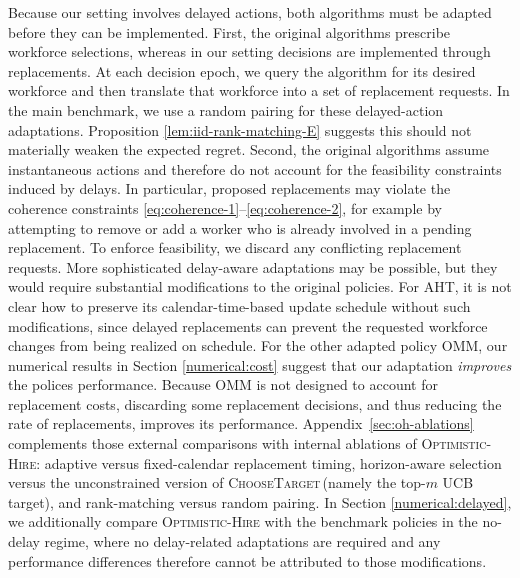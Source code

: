 \documentclass[opre,blindrev]{informs3}
\newcommand{\ChooseTarget}{\textsc{ChooseTarget}\,}
\begin{document}
Because our setting involves delayed actions, both algorithms must be adapted before they can be implemented. First, the original algorithms prescribe workforce selections, whereas in our setting decisions are implemented through replacements. At each decision epoch, we query the algorithm for its desired workforce and then translate that workforce into a set of replacement requests. In the main benchmark, we use a random pairing for these delayed-action adaptations. Proposition \ref{lem:iid-rank-matching-E} suggests this should not materially weaken the expected regret. Second, the original algorithms assume instantaneous actions and therefore do not account for the feasibility constraints induced by delays. In particular, proposed replacements may violate the coherence constraints \eqref{eq:coherence-1}--\eqref{eq:coherence-2}, for example by attempting to remove or add a worker who is already involved in a pending replacement. To enforce feasibility, we discard any conflicting replacement requests. More sophisticated delay-aware adaptations may be possible, but they would require substantial modifications to the original policies. For \textsc{AHT}, it is not clear how to preserve its calendar-time-based update schedule without such modifications, since delayed replacements can prevent the requested workforce changes from being realized on schedule. For the other adapted policy \textsc{OMM}, our numerical results in Section \ref{numerical:cost} suggest that our adaptation \emph{improves} the polices performance. Because \textsc{OMM} is not designed to account for replacement costs, discarding some replacement decisions, and thus reducing the rate of replacements, improves its performance. 
Appendix~\ref{sec:oh-ablations} complements those external comparisons with internal ablations of \textsc{Optimistic-Hire}: adaptive versus fixed-calendar replacement timing, horizon-aware selection versus the unconstrained version of \ChooseTarget (namely the top-\(m\) UCB target), and rank-matching versus random pairing. In Section \ref{numerical:delayed}, we additionally compare \textsc{Optimistic-Hire} with the benchmark policies in the no-delay regime, where no delay-related adaptations are required and any performance differences therefore cannot be attributed to those modifications.
\end{document}
